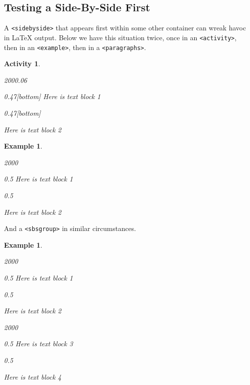 \documentclass{sn-jnl}
\theoremstyle{thmstyleone}%
\theoremstyle{thmstyletwo}%
\newtheorem{activity}[theorem]{Activity}
\newtheorem{example}[theorem]{Example}
\theoremstyle{thmstylethree}%
\newcommand{\mono}[1]{\texttt{#1}}
\numberwithin{equation}{section}
\begin{document}
\subsection{Testing a Side-By-Side First}\label{section-side-by-side-18}%
A \mono{<sidebyside>} that appears first within some other container can wreak havoc in \LaTeX{} output.  Below we have this situation twice, once in an \mono{<activity>}, then in an \mono{<example>}, then in a \mono{<paragraphs>}.%
\begin{activity}\label{section-side-by-side-18-3}%
%
\begin{sidebyside}{2}{0}{0}{0.06}%
\begin{sbspanel}{0.47}[bottom]%
Here is text block 1%
\end{sbspanel}%
\begin{sbspanel}{0.47}[bottom]%
\par
Here is text block 2%
\end{sbspanel}%
\end{sidebyside}%
\end{activity}%
\begin{example}\label{section-side-by-side-18-4}%
%
\begin{sidebyside}{2}{0}{0}{0}%
\begin{sbspanel}{0.5}%
Here is text block 1%
\end{sbspanel}%
\begin{sbspanel}{0.5}%
\par
Here is text block 2%
\end{sbspanel}%
\end{sidebyside}%
\end{example}
And a \mono{<sbsgroup>} in similar circumstances.%
\begin{example}\label{section-side-by-side-18-6}%
%
\begin{sidebyside}{2}{0}{0}{0}%
\begin{sbspanel}{0.5}%
Here is text block 1%
\end{sbspanel}%
\begin{sbspanel}{0.5}%
\par
Here is text block 2%
\end{sbspanel}%
\end{sidebyside}%
\begin{sidebyside}{2}{0}{0}{0}%
\begin{sbspanel}{0.5}%
Here is text block 3%
\end{sbspanel}%
\begin{sbspanel}{0.5}%
\par
Here is text block 4%
\end{sbspanel}%
\end{sidebyside}%
\end{example}
\end{document}
